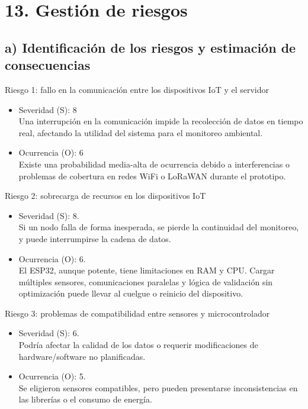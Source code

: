 \documentclass[
11pt, %
]{charter}
\begin{document}
\section{13. Gestión de riesgos}
\label{sec:riesgos}

\subsection*{a) Identificación de los riesgos y estimación de consecuencias}

Riesgo 1: fallo en la comunicación entre los dispositivos IoT y el servidor

\begin{itemize}
	\item Severidad (S): 8\\
	Una interrupción en la comunicación impide la recolección de datos en tiempo real, afectando la utilidad del sistema para el monitoreo ambiental.
	\item Ocurrencia (O): 6\\
	Existe una probabilidad media-alta de ocurrencia debido a interferencias o problemas de cobertura en redes WiFi o LoRaWAN durante el prototipo.
\end{itemize}

Riesgo 2: sobrecarga de recursos en los dispositivos IoT

\begin{itemize}
	\item Severidad (S): 8.\\
	Si un nodo falla de forma inesperada, se pierde la continuidad del monitoreo, y puede interrumpirse la cadena de datos.
	\item Ocurrencia (O): 6.\\
	El ESP32, aunque potente, tiene limitaciones en RAM y CPU. Cargar múltiples sensores, comunicaciones paralelas y lógica de validación sin optimización puede llevar al cuelgue o reinicio del dispositivo.
\end{itemize}

Riesgo 3: problemas de compatibilidad entre sensores y microcontrolador

\begin{itemize}
	\item Severidad (S): 6.\\
	Podría afectar la calidad de los datos o requerir modificaciones de hardware/software no planificadas.
	\item Ocurrencia (O): 5.\\
	Se eligieron sensores compatibles, pero pueden presentarse inconsistencias en las librerías o el consumo de energía.
\end{itemize}
\end{document}
